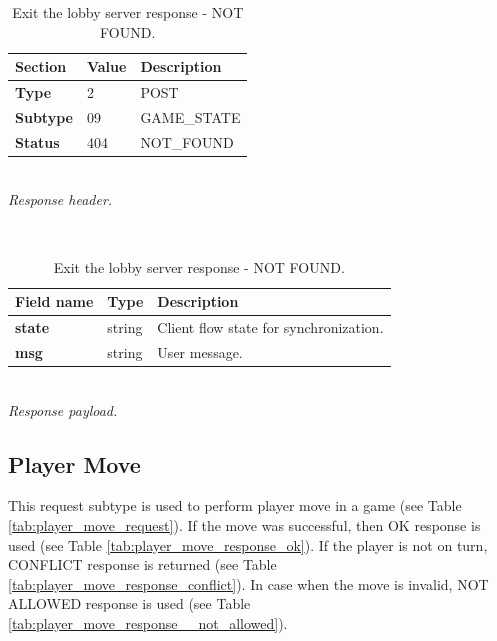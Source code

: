 \documentclass[english, sem, kiv, he, iso690alph, pdf, viewonly]{fasthesis}
\begin{document}
\begin{table}[h!]
	\centering
	\begin{minipage}[b]{1.0\textwidth}
		\centering
		\begin{tabular}{|l|l|l|}
			\hline
			\textbf{Section} & \textbf{Value} & \textbf{Description} \\ \hline
			\textbf{Type} & 2 & \footnotesize{POST} \\ \hline
			\textbf{Subtype} & 09 & \footnotesize{GAME\_STATE}  \\ \hline
			\textbf{Status} & 404 & \footnotesize{NOT\_FOUND} \\ \hline
		\end{tabular} \\
		\textit{Response header.}
	\end{minipage} 
	\\
	\vspace{10pt}
	\begin{minipage}[b]{1.0\textwidth}
		\centering
		\begin{tabular}{|l|l|l|}
			\hline
			\textbf{Field name} & \textbf{Type} & \textbf{Description} \\ \hline
			\textbf{state} & string & Client flow state for synchronization. \\ \hline
            \textbf{msg} & string & User message. \\ \hline
		\end{tabular} \\
		\textit{Response payload.}
	\end{minipage}	
	\caption{Exit the lobby server response - NOT FOUND.}
	\label{tab:get_game_state_response_not_found}
\end{table}

\newpage

\subsection{Player Move}
This request subtype is used to perform player move in a game (see Table \ref{tab:player_move_request}). If the move was successful, then OK response is used (see Table \ref{tab:player_move_response_ok}). If the player is not on turn, CONFLICT response is returned (see Table \ref{tab:player_move_response_conflict}). In case when the move is invalid, NOT ALLOWED response is used (see Table \ref{tab:player_move_response__not_allowed}).
\end{document}
